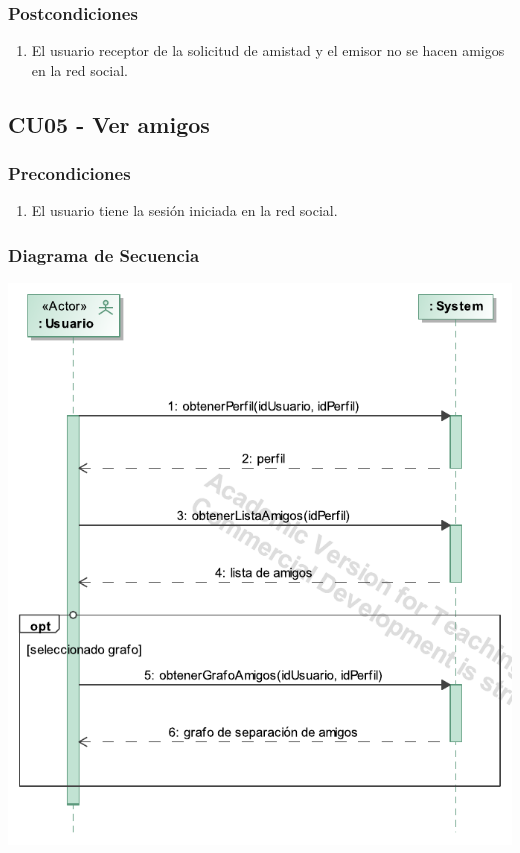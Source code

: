 \documentclass[12pt, a4paper, titlepage]{article}
\begin{document}
\subsubsection{Postcondiciones}
\begin{enumerate}
	\item El usuario receptor de la solicitud de amistad y el emisor no se hacen amigos en la red social.
\end{enumerate}


\subsection{CU05 - Ver amigos}

\subsubsection{Precondiciones}
\begin{enumerate}
	\item El usuario tiene la sesión iniciada en la red social.
\end{enumerate}

\subsubsection{Diagrama de Secuencia}
\begin{center}
	\includegraphics[width=\textwidth]{Imagenes/Ver_amigos}
\end{center}
\end{document}
